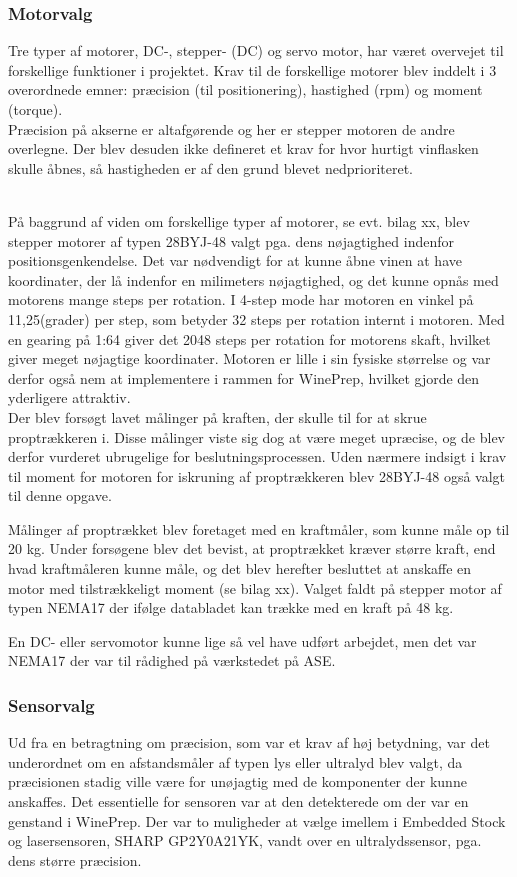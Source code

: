 \subsubsection{Motorvalg}

Tre typer af motorer, DC-, stepper- (DC) og servo motor, har været overvejet til forskellige funktioner i projektet. Krav til de forskellige motorer blev inddelt i 3 overordnede emner: præcision (til positionering), hastighed (rpm) og moment (torque).\\

Præcision på akserne er altafgørende og her er stepper motoren de andre overlegne. Der blev desuden ikke defineret et krav for hvor hurtigt vinflasken skulle åbnes, så hastigheden er af den grund blevet nedprioriteret.

\\
På baggrund af viden om forskellige typer af motorer, se evt. bilag xx, blev stepper motorer af typen 28BYJ-48 valgt pga. dens nøjagtighed indenfor positionsgenkendelse. Det var nødvendigt for at kunne åbne vinen at have koordinater, der lå indenfor en milimeters nøjagtighed, og det kunne opnås med motorens mange steps per rotation. I 4-step mode har motoren en vinkel på 11,25(grader) per step, som betyder 32 steps per rotation internt i motoren. Med en gearing på 1:64 giver det 2048 steps per rotation for motorens skaft, hvilket giver meget nøjagtige koordinater. Motoren er lille i sin fysiske størrelse og var derfor også nem at implementere i rammen for WinePrep, hvilket gjorde den yderligere attraktiv.\\

Der blev forsøgt lavet målinger på kraften, der skulle til for at skrue proptrækkeren i. Disse målinger viste sig dog at være meget upræcise, og de blev derfor vurderet ubrugelige for beslutningsprocessen. Uden nærmere indsigt i krav til moment for motoren for iskruning af proptrækkeren blev 28BYJ-48 også valgt til denne opgave.

Målinger af proptrækket blev foretaget med en kraftmåler, som kunne måle op til 20 kg. Under forsøgene blev det bevist, at proptrækket kræver større kraft, end hvad kraftmåleren kunne måle, og det blev herefter besluttet at anskaffe en motor med tilstrækkeligt moment (se bilag xx). Valget faldt på stepper motor af typen NEMA17 der ifølge databladet kan trække med en kraft på 48 kg. 

En DC- eller servomotor kunne lige så vel have udført arbejdet, men det var NEMA17 der var til rådighed på værkstedet på ASE.

\subsubsection{Sensorvalg}
Ud fra en betragtning om præcision, som var et krav af høj betydning, var det underordnet om en afstandsmåler af typen lys eller ultralyd blev valgt, da præcisionen stadig ville være for unøjagtig med de komponenter der kunne anskaffes. Det essentielle for sensoren var at den detekterede om der var en genstand i WinePrep. Der var to muligheder at vælge imellem i Embedded Stock og lasersensoren, SHARP GP2Y0A21YK, vandt over en ultralydssensor, pga. dens større præcision.